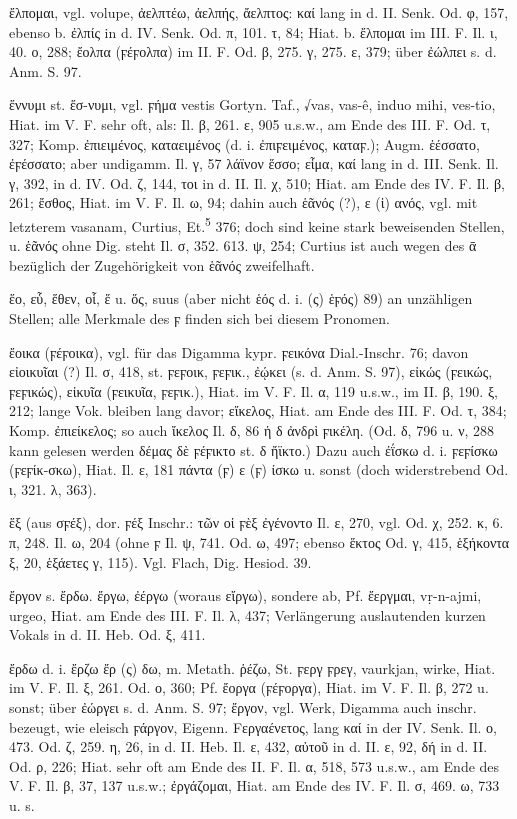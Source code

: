 ἔλπομαι, vgl.  volupe, ἀελπτέω, ἀελπής, ἄελπτος: καί lang in d. II. Senk. Od. φ, 157, ebenso b. ἐλπίς in d. IV. Senk. Od. π, 101. τ, 84; Hiat. b. ἔλπομαι im III. F. Il. ι, 40. ο, 288; ἔολπα (ϝέϝολπα) im II. F. Od. β, 275. γ, 275. ε, 379; über ἐώλπει s. d. Anm. S. 97.

ἕννυμι st. ἕσ-νυμι, vgl. ϝήμα vestis Gortyn. Taf.,  √vas, vas-ê, induo mihi,  ves-tio, Hiat. im V. F. sehr oft, als: Il. β, 261. ε, 905 u.s.w., am Ende des III. F. Od. τ, 327; Komp. ἐπιειμένος, καταειμένος (d. i. ἐπιϝειμένος, καταϝ.); Augm. ἑέσσατο, ἐϝέσσατο; aber undigamm. Il. γ, 57 λάϊνον ἕσσο; εἷμα, καί lang in d. III. Senk. Il. γ, 392, in d. IV. Od. ζ, 144, τοι in d. II. Il. χ, 510; Hiat. am Ende des IV. F. Il. β, 261; ἔσθος, Hiat. im V. F. Il. ω, 94; dahin auch ἑᾶνός (?), ε (ἱ) ανός, vgl. mit letzterem  vasanam, Curtius, Et.\textsuperscript{5} 376; doch sind keine stark beweisenden Stellen, u. ἑᾶνός ohne Dig. steht Il. σ, 352. 613. ψ, 254; Curtius ist auch wegen des ᾱ bezüglich der Zugehörigkeit von ἑᾶνός zweifelhaft.

ἕο, εὗ, ἕθεν, οἷ, ἕ u. ὅς, suus (aber nicht ἑός d. i. (ς) ἑϝός) 89) an unzähligen Stellen; alle Merkmale des ϝ finden sich bei diesem Pronomen.

ἔοικα (ϝέϝοικα), vgl. für das Digamma kypr. ϝεικόνα Dial.-Inschr. 76; davon εἰοικυῖαι (?) Il. σ, 418, st. ϝεϝοικ, ϝεϝικ., ἐῴκει (s. d. Anm. S. 97), εἰκώς (ϝεικώς, ϝεϝικώς), εἰκυῖα (ϝεικυῖα, ϝεϝικ.), Hiat. im V. F. Il. α, 119 u.s.w., im II. β, 190. ξ, 212; lange Vok. bleiben lang davor; εἴκελος, Hiat. am Ende des III. F. Od. τ, 384; Komp. ἐπιείκελος; so auch ἴκελος Il. δ, 86 ἡ δ ἀνδρὶ ϝικέλη. (Od. δ, 796 u. ν, 288 kann gelesen werden δέμας δὲ ϝέϝικτο st. δ ἤϊκτο.) Dazu auch ἐΐσκω d. i. ϝεϝίσκω (ϝεϝίκ-σκω), Hiat. Il. ε, 181 πάντα (ϝ) ε (ϝ) ίσκω u. sonst (doch widerstrebend Od. ι, 321. λ, 363).

ἕξ (aus σϝέξ), dor. ϝέξ Inschr.: τῶν οἱ ϝὲξ ἐγένοντο Il. ε, 270, vgl. Od. χ, 252. κ, 6. π, 248. Il. ω, 204 (ohne ϝ Il. ψ, 741. Od. ω, 497; ebenso ἕκτος Od. γ, 415, ἑξήκοντα ξ, 20, ἑξάετες γ, 115). Vgl. Flach, Dig. Hesiod. 39.

ἔργον s. ἔρδω. ἔργω, ἐέργω (woraus εἴργω), sondere ab, Pf. ἔεργμαι,  vṛ-n-ajmi,  urgeo, Hiat. am Ende des III. F. Il. λ, 437; Verlängerung auslautenden kurzen Vokals in d. II. Heb. Od. ξ, 411.

ἔρδω d. i. ἔρζω ἔρ (ς) δω, m. Metath. ῥέζω, St. ϝεργ ϝρεγ,  vaurkjan, wirke, Hiat. im V. F. Il. ξ, 261. Od. ο, 360; Pf. ἔοργα (ϝέϝοργα), Hiat. im V. F. Il. β, 272 u. sonst; über ἐώργει s. d. Anm. S. 97; ἔργον, vgl. Werk, Digamma auch inschr. bezeugt, wie eleisch ϝάργον,  Eigenn. Fεργαένετος, lang καί in der IV. Senk. Il. ο, 473. Od. ζ, 259. η, 26, in d. II. Heb. Il. ε, 432, αὐτοῦ in d. II. ε, 92, δή in d. II. Od. ρ, 226; Hiat. sehr oft am Ende des II. F. Il. α, 518, 573 u.s.w., am Ende des V. F. Il. β, 37, 137 u.s.w.; ἐργάζομαι, Hiat. am Ende des IV. F. Il. σ, 469. ω, 733 u. s.

